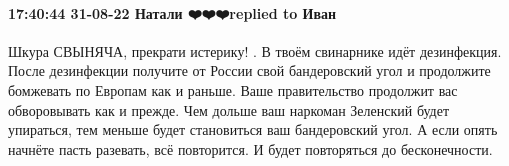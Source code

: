  
 
 
 
 

\paragraph{17:40:44 31-08-22 Натали ❤️❤️❤️replied to Иван}

Шкура СВЫНЯЧА, прекрати истерику! . В твоём свинарнике идёт дезинфекция.
После дезинфекции получите от России свой бандеровский угол и продолжите бомжевать по Европам как и раньше.
Ваше правительство продолжит вас обворовывать как и прежде.
Чем дольше ваш наркоман Зеленский будет упираться, тем меньше будет становиться ваш бандеровский угол.
А если опять начнёте пасть разевать, всё повторится. И будет повторяться до бесконечности.
